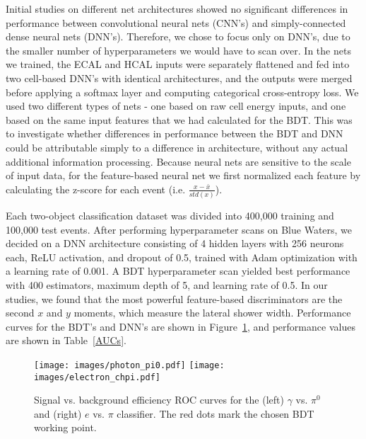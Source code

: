 Initial studies on different net architectures showed no significant differences in performance between convolutional neural nets (CNN's) and simply-connected dense neural nets (DNN's). Therefore, we chose to focus only on DNN's, due to the smaller number of hyperparameters we would have to scan over. In the nets we trained, the ECAL and HCAL inputs were separately flattened and fed into two cell-based DNN's with identical architectures, and the outputs were merged before applying a softmax layer and computing categorical cross-entropy loss. We used two different types of nets - one based on raw cell energy inputs, and one based on the same input features that we had calculated for the BDT. This was to investigate whether differences in performance between the BDT and DNN could be attributable simply to a difference in architecture, without any actual additional information processing. Because neural nets are sensitive to the scale of input data, for the feature-based neural net we first normalized each feature by calculating the z-score for each event (i.e. $\frac{x-\bar{x}}{std(x)}$).

Each two-object classification dataset was divided into 400,000 training and 100,000 test events. After performing hyperparameter scans on Blue Waters, we decided on a DNN architecture consisting of 4 hidden layers with 256 neurons each, ReLU activation, and dropout of 0.5, trained with Adam optimization with a learning rate of 0.001. A BDT hyperparameter scan yielded best performance with 400 estimators, maximum depth of 5, and learning rate of 0.5. In our studies, we found that the most powerful feature-based discriminators are the second $x$ and $y$ moments, which measure the lateral shower width. Performance curves for the BDT's and DNN's are shown in Figure~\ref{ROCs}, and performance values are shown in Table~\ref{AUCs}.

\begin{figure}[!t]
    \centering
    \texttt{[image: images/photon\_pi0.pdf]}
    \texttt{[image: images/electron\_chpi.pdf]}
    \caption{Signal vs. background efficiency ROC curves for the (left) $\gamma$ vs. $\pi^0$ and (right) $e$ vs. $\pi$ classifier. The red dots mark the chosen BDT working point.}
    \label{ROCs}
\end{figure}

